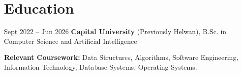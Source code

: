 \section{Education}
    
    \begin{twocolentry}{Sept 2022 – Jun 2026}
        \textbf{Capital University} (Previously Helwan), B.Sc. in Computer Science and Artificial Intelligence
    \end{twocolentry}
    
    \vspace{0.1cm}
    \begin{onecolentry}
        
    \begin{highlights}
    \item\textbf{Relevant Coursework:} Data Structures, Algorithms,  
    Software Engineering,   Information Technology,  Database Systems, Operating Systems.
    \end{highlights}
    
    \end{onecolentry}
        \vspace{0.1cm}
